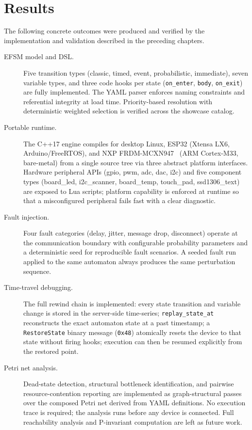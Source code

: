 \section{Results}
\label{sec:results}

The following concrete outcomes were produced and verified by the implementation and validation described in the preceding chapters.

\begin{description}
  \item[EFSM model and DSL.] Five transition types (classic, timed, event, probabilistic, immediate), seven variable types, and three code hooks per state (\texttt{on\_enter}, \texttt{body}, \texttt{on\_exit}) are fully implemented. The YAML parser enforces naming constraints and referential integrity at load time. Priority-based resolution with deterministic weighted selection is verified across the showcase catalog.

  \item[Portable runtime.] The C++17 engine compiles for desktop Linux, ESP32 (Xtensa LX6, Arduino/FreeRTOS), and NXP FRDM-MCXN947~\cite{NXPFRDMMCXN947} (ARM Cortex-M33, bare-metal) from a single source tree via three abstract platform interfaces. Hardware peripheral APIs (gpio, pwm, adc, dac, i2c) and five component types (board\_led, i2c\_scanner, board\_temp, touch\_pad, ssd1306\_text) are exposed to Lua scripts; platform capability is enforced at runtime so that a misconfigured peripheral fails fast with a clear diagnostic.

  \item[Fault injection.] Four fault categories (delay, jitter, message drop, disconnect) operate at the communication boundary with configurable probability parameters and a deterministic seed for reproducible fault scenarios. A seeded fault run applied to the same automaton always produces the same perturbation sequence.

  \item[Time-travel debugging.] The full rewind chain is implemented: every state transition and variable change is stored in the server-side time-series; \texttt{replay\_state\_at} reconstructs the exact automaton state at a past timestamp; a \texttt{RestoreState} binary message (\texttt{0x48}) atomically resets the device to that state without firing hooks; execution can then be resumed explicitly from the restored point.

  \item[Petri net analysis.] Dead-state detection, structural bottleneck identification, and pairwise resource-contention reporting are implemented as graph-structural passes over the composed Petri net derived from YAML definitions. No execution trace is required; the analysis runs before any device is connected. Full reachability analysis and P-invariant computation are left as future work.


\end{description}

